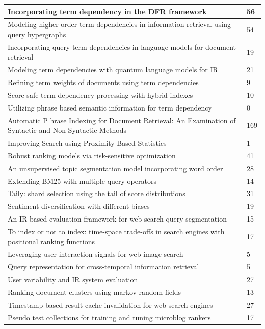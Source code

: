 \documentclass[letterpaper,11pt]{article}
\begin{document}
\begin{center}
\begin{longtable}{|*2{p{3.5cm}| }}
Incorporating term dependency in the DFR framework & 56 \\ \hline
Modeling higher-order term dependencies in information retrieval using query hypergraphs & 54 \\ \hline
Incorporating query term dependencies in language models for document retrieval & 19 \\ \hline
Modeling term dependencies with quantum language models for IR & 21 \\ \hline
Refining term weights of documents using term dependencies & 9 \\ \hline
Score-safe term-dependency processing with hybrid indexes & 10 \\ \hline
Utilizing phrase based semantic information for term dependency & 0 \\ \hline
Automatic P hrase Indexing for Document Retrieval: An Examination of Syntactic and Non-Syntactic Methods & 169 \\ \hline
Improving Search using Proximity-Based Statistics & 1 \\ \hline
Robust ranking models via risk-sensitive optimization & 41 \\ \hline
An unsupervised topic segmentation model incorporating word order & 28 \\ \hline
Extending BM25 with multiple query operators & 14 \\ \hline
Taily: shard selection using the tail of score distributions & 31 \\ \hline
Sentiment diversification with different biases & 19 \\ \hline
An IR-based evaluation framework for web search query segmentation & 15 \\ \hline
To index or not to index: time-space trade-offs in search engines with positional ranking functions & 17 \\ \hline
Leveraging user interaction signals for web image search & 5 \\ \hline
Query representation for cross-temporal information retrieval & 5 \\ \hline
User variability and IR system evaluation & 27 \\ \hline
Ranking document clusters using markov random fields & 13 \\ \hline
Timestamp-based result cache invalidation for web search engines & 27 \\ \hline
Pseudo test collections for training and tuning microblog rankers & 17 \\ \hline

\end{longtable}
\end{center}
\end{document}
